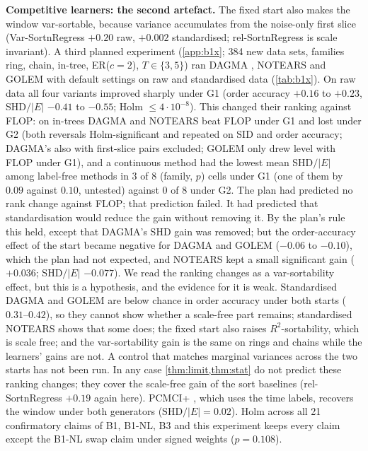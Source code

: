 \documentclass{article}
\theoremstyle{plain}
\theoremstyle{definition}
\theoremstyle{remark}
\begin{document}
\textbf{Competitive learners: the second artefact.} The fixed start also
makes the window var-sortable, because variance accumulates from the
noise-only first slice (Var-SortnRegress $+0.20$ raw, $+0.002$ standardised;
rel-SortnRegress is scale invariant). A third planned experiment
(\cref{app:b1x}; 384 new data sets, families ring, chain, in-tree, ER($c{=}2$),
$T\in\{3,5\}$) ran DAGMA \citep{bello2022dagma}, NOTEARS
\citep{zheng2018notears} and GOLEM \citep{ng2020golem} with default settings on
raw and standardised data (\cref{tab:b1x}). On raw data all four variants
improved sharply under G1 (order accuracy $+0.16$ to $+0.23$, SHD$/|E|$ $-0.41$
to $-0.55$; Holm $\le4\cdot10^{-8}$). This
changed their ranking against FLOP: on in-trees DAGMA and NOTEARS beat FLOP
under G1 and lost under G2 (both reversals Holm-significant and repeated on
SID and order accuracy; DAGMA's also with first-slice pairs excluded; GOLEM
only drew level with FLOP under G1), and a continuous method had the lowest
mean SHD$/|E|$ among label-free methods in 3 of 8 (family, $p$) cells under G1
(one of them by $0.09$ against $0.10$, untested) against 0 of 8 under G2. The
plan had predicted no rank change against FLOP; that prediction failed. It
had predicted that standardisation would reduce the gain without removing it.
By the plan's rule this held, except that DAGMA's SHD gain was removed; but
the order-accuracy effect of the start became negative for DAGMA and GOLEM
($-0.06$ to $-0.10$), which the plan had not expected, and NOTEARS kept a small
significant gain ($+0.036$; SHD$/|E|$ $-0.077$). We read the ranking changes
as a var-sortability effect, but this is a hypothesis, and the evidence for
it is weak. Standardised DAGMA and GOLEM are below chance in order accuracy
under both starts ($0.31$--$0.42$), so they cannot show whether a scale-free
part remains; standardised NOTEARS shows that some does; the fixed start also
raises $R^2$-sortability, which is scale free; and the var-sortability gain
is the same on rings and chains while the learners' gains are not. A control
that matches marginal variances across the two starts has not been run. In
any case \cref{thm:limit,thm:stat} do not predict these ranking changes; they
cover the scale-free gain of the sort baselines (rel-SortnRegress $+0.19$
again here). PCMCI+ \citep{runge2020pcmciplus}, which uses the time labels,
recovers the window under both generators ($\mathrm{SHD}/|E|=0.02$).
Holm across all 21 confirmatory claims of B1, B1-NL, B3 and this experiment
keeps every claim except the B1-NL swap claim under signed weights ($p=0.108$).
\end{document}
